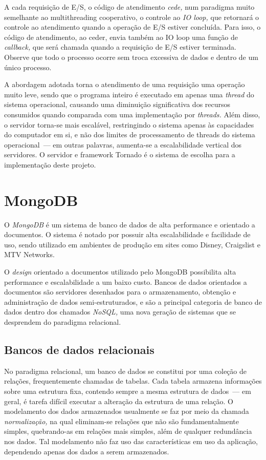 \documentclass[ruledheader, 12pt]{abnt}
\begin{document}
A cada requisição de E/S, o código de atendimento \emph{cede,} num paradigma muito semelhante ao multithreading cooperativo, o controle ao \emph{IO loop,} que retornará o controle ao atendimento quando a operação de E/S estiver concluída. Para isso, o código de atendimento, ao ceder, envia também ao IO loop uma função de \emph{callback,} que será chamada quando a requisição de E/S estiver terminada. Observe que todo o processo ocorre sem troca excessiva de dados e dentro de um único processo.

A abordagem adotada torna o atendimento de uma requisição uma operação muito leve, sendo que o programa inteiro é executado em apenas uma \emph{thread} do sistema operacional, causando uma diminuição significativa dos recursos consumidos quando comparada com uma implementação por \emph{threads.} Além disso, o servidor torna-se mais escalável, restringindo o sistema apenas às capacidades do computador em si, e não dos limites de processamento de threads do sistema operacional~--- em outras palavras, aumenta-se a escalabilidade vertical dos servidores. O servidor e framework Tornado é o sistema de escolha para a implementação deste projeto.

\section{MongoDB}

O \emph{MongoDB} é um sistema de banco de dados de alta performance e orientado a documentos. O sistema é notado por possuir alta escalabilidade e facilidade de uso, sendo utilizado em ambientes de produção em sites como Disney, Craigslist e MTV Networks.

O \emph{design} orientado a documentos utilizado pelo MongoDB possibilita alta performance e escalabilidade a um baixo custo. Bancos de dados orientados a documentos são servidores desenhados para o armazenamento, obtenção e administração de dados semi-estruturados, e são a principal categoria de banco de dados dentro dos chamados \emph{NoSQL,} uma nova geração de sistemas que se desprendem do paradigma relacional.

\subsection{Bancos de dados relacionais}

No paradigma relacional, um banco de dados se constitui por uma coleção de relações, frequentemente chamadas de tabelas. Cada tabela armazena informações sobre uma estrutura fixa, contendo sempre a mesma estrutura de dados~--- em geral, é tarefa difícil executar a alteração da estrutura de uma relação. O modelamento dos dados armazenados usualmente se faz por meio da chamada \emph{normalização,} na qual eliminam-se relações que não são fundamentalmente simples, quebrando-as em relações mais simples, além de qualquer redundância nos dados. Tal modelamento não faz uso das características em uso da aplicação, dependendo apenas dos dados a serem armazenados.
\end{document}
